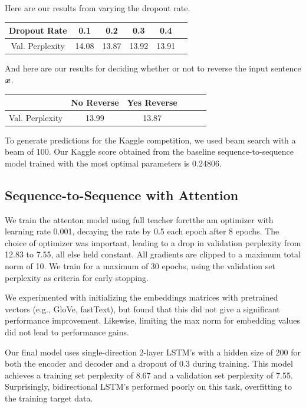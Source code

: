 \documentclass[11pt]{article}
\begin{document}
Here are our results from varying the dropout rate. 

\begin{center}
	\begin{tabular}{ c | c c c c c}
		 Dropout Rate & 0.1 & 0.2 & 0.3 & 0.4   \\
		\hline
		Val. Perplexity & 14.08 & 13.87 & 13.92 & 13.91
	\end{tabular}
\end{center} 

And here are our results for deciding whether or not to reverse the input sentence $\boldsymbol{x}$.  
\begin{center}
	\begin{tabular}{ c | c c c c c}
		  & No Reverse & Yes Reverse   \\
		\hline
		Val. Perplexity & 13.99 & 13.87
	\end{tabular}
\end{center} 

To generate predictions for the Kaggle competition, we used beam search with a beam of 100.  Our Kaggle score obtained from the baseline sequence-to-sequence model trained with the most optimal parameters is 0.24806.   

\subsection{Sequence-to-Sequence with Attention} 
We train the attenton model using full teacher forctthe am optimizer with learning rate 0.001, decaying the rate by 0.5 each epoch after 8 epochs. The choice of optimizer was important, leading to a drop in validation perplexity from 12.83 to 7.55, all else held constant. All gradients are clipped to a maximum total norm of 10. We train for a maximum of 30 epochs, using the validation set perplexity as criteria for early stopping. 

We experimented with initializing the embeddings matrices with pretrained vectors (e.g., GloVe, fastText), but found that this did not give a significant performance improvement. Likewise, limiting the max norm for embedding values did not lead to performance gains.

Our final model uses single-direction 2-layer LSTM's with a hidden size of 200 for both the encoder and decoder and a dropout of 0.3 during training. This model achieves a training set perplexity of 8.67 and a validation set perplexity of 7.55. Surprisingly, bidirectional LSTM's performed poorly on this task, overfitting to the training target data.
\end{document}

